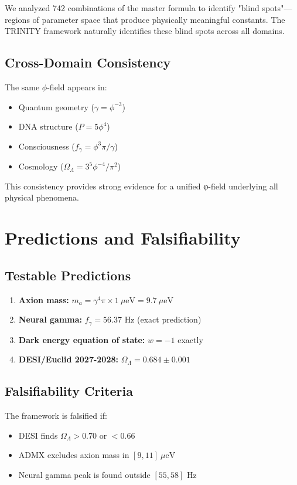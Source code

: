 \documentclass[12pt,a4paper]{article}
\begin{document}
We analyzed 742 combinations of the master formula to identify "blind spots"—regions
of parameter space that produce physically meaningful constants. The TRINITY
framework naturally identifies these blind spots across all domains.

\subsection{Cross-Domain Consistency}

The same $\phi$-field appears in:
\begin{itemize}
    \item Quantum geometry ($\gamma = \phi^{-3}$)
    \item DNA structure ($P = 5\phi^4$)
    \item Consciousness ($f_\gamma = \phi^3\pi/\gamma$)
    \item Cosmology ($\Omega_\Lambda = 3^5\phi^{-4}/\pi^2$)
\end{itemize}

This consistency provides strong evidence for a unified φ-field underlying
all physical phenomena.

\section{Predictions and Falsifiability}

\subsection{Testable Predictions}

\begin{enumerate}
    \item \textbf{Axion mass:} $m_a = \gamma^4 \pi \times 1~\mu\text{eV} = 9.7~\mu\text{eV}$
    \item \textbf{Neural gamma:} $f_\gamma = 56.37$ Hz (exact prediction)
    \item \textbf{Dark energy equation of state:} $w = -1$ exactly
    \item \textbf{DESI/Euclid 2027-2028:} $\Omega_\Lambda = 0.684 \pm 0.001$
\end{enumerate}

\subsection{Falsifiability Criteria}

The framework is falsified if:
\begin{itemize}
    \item DESI finds $\Omega_\Lambda > 0.70$ or $< 0.66$
    \item ADMX excludes axion mass in $[9, 11]~\mu\text{eV}$
    \item Neural gamma peak is found outside $[55, 58]$ Hz
\end{itemize}
\end{document}
